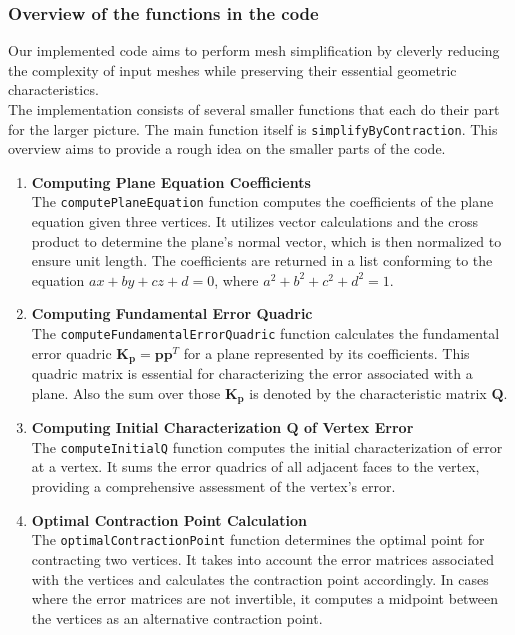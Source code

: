 \subsubsection{Overview of the functions in the code}
Our implemented code aims to perform mesh simplification by cleverly reducing the complexity of input meshes while preserving their essential geometric characteristics.\\
The implementation consists of several smaller functions that each do their part for the larger picture. The main function itself is \texttt{simplifyByContraction}. This overview aims to provide a rough idea on the smaller parts of the code.

\begin{enumerate}
    \item \textbf{Computing Plane Equation Coefficients} \\
    The \texttt{computePlaneEquation} function computes the coefficients of the plane equation given three vertices. It utilizes vector calculations and the cross product to determine the plane's normal vector, which is then normalized to ensure unit length. The coefficients are returned in a list conforming to the equation \(ax + by + cz + d = 0\), where \(a^2 + b^2 + c^2 + d^2 = 1\).
    
    \item \textbf{Computing Fundamental Error Quadric} \\
    The \texttt{computeFundamentalErrorQuadric} function calculates the fundamental error quadric \(\bm{K_p} = \bm{pp}^T\) for a plane represented by its coefficients. This quadric matrix is essential for characterizing the error associated with a plane. Also the sum over those \(\bm{K_p}\) is denoted by the characteristic matrix \(\bm{Q}\).
    
    \item \textbf{Computing Initial Characterization \(\bm{Q}\) of Vertex Error} \\
    The \texttt{computeInitialQ} function computes the initial characterization of error at a vertex. It sums the error quadrics of all adjacent faces to the vertex, providing a comprehensive assessment of the vertex's error.
    
    \item \textbf{Optimal Contraction Point Calculation} \\
    The \texttt{optimalContractionPoint} function determines the optimal point for contracting two vertices. It takes into account the error matrices associated with the vertices and calculates the contraction point accordingly. In cases where the error matrices are not invertible, it computes a midpoint between the vertices as an alternative contraction point.
    

\end{enumerate}
